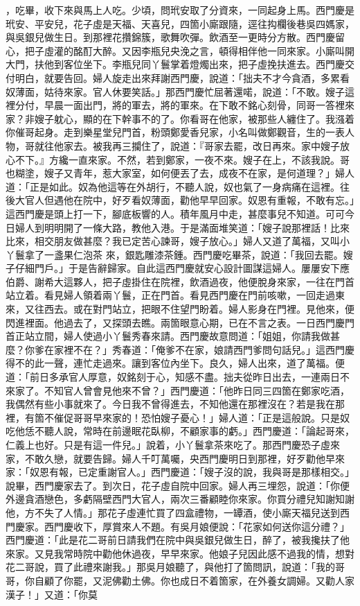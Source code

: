，吃畢，收下來與馬上人吃。少頃，問玳安取了分資來，一同起身上馬。西門慶是玳安、平安兒，花子虛是天福、天喜兒，四箇小廝跟隨，逕往抅欄後巷吳四媽家，與吳銀兒做生日。到那裡花攢錦簇，歌舞吹彈。飲酒至一更時分方散。西門慶留心，把子虛灌的酩酊大醉。又因李瓶兒央浼之言，頓得相伴他一同來家。小廝叫開大門，扶他到客位坐下。李瓶兒同丫鬟掌着燈燭出來，把子虛挽扶進去。西門慶交付明白，就要告回。婦人旋走出來拜謝西門慶，說道：「拙夫不才今貪酒，多累看奴薄面，姑待來家。官人休要笑話。」那西門慶忙屈著還喏，說道：「不敢。嫂子這裡分付，早晨一面出門，將的軍去，將的軍來。在下敢不銘心刻骨，同哥一答裡來家？非嫂子躭心，顯的在下幹事不的了。你看哥在他家，被那些人纏住了。我漒着你催哥起身。走到樂星堂兒門首，粉頭鄭愛香兒家，小名叫做鄭觀音，生的一表人物，哥就往他家去。被我再三攔住了，說道：『哥家去罷，改日再來。家中嫂子放心不下。』方纔一直來家。不然，若到鄭家，一夜不來。嫂子在上，不該我說。哥也糊塗，嫂子又青年，惹大家室，如何便丟了去，成夜不在家，是何道理？」婦人道：「正是如此。奴為他這等在外胡行，不聽人說，奴也氣了一身病痛在這裡。往後大官人但遇他在院中，好歹看奴薄面，勸他早早回家。奴恩有重報，不敢有忘。」這西門慶是頭上打一下，腳底板響的人。積年風月中走，甚麼事兒不知道。可可今日婦人到明明開了一條大路，教他入港。于是滿面堆笑道：「嫂子說那裡話！比來比來，相交朋友做甚麼？我已定苦心諫哥，嫂子放心。」婦人又道了萬福，又叫小丫鬟拿了一盞果仁泡茶 來，銀匙雕漆茶鍾。西門慶吃畢茶，說道：「我回去罷。嫂子仔細門戶。」于是告辭歸家。自此這西門慶就安心設計圖謀這婦人。屢屢安下應伯爵、謝希大這夥人，把子虛掛住在院裡，飲酒過夜，他便脫身來家，一往在門首站立着。看見婦人領着兩丫鬟，正在門首。看見西門慶在門前咳嗽，一回走過東來，又往西去。或在對門站立，把眼不住望門盼着。婦人影身在門裡。見他來，便閃進裡面。他過去了，又探頭去瞧。兩箇眼意心期，已在不言之表。一日西門慶門首正站立間，婦人使過小丫鬟秀春來請。西門慶故意問道：「姐姐，你請我做甚麼？你爹在家裡不在？」秀春道：「俺爹不在家，娘請西門爹問句話兒。」這西門慶得不的此一聲，連忙走過來。讓到客位內坐下。良久，婦人出來，道了萬福。便道：「前日多承官人厚意，奴銘刻于心，知感不盡。拙夫從昨日出去，一連兩日不來家了。不知官人曾會見他來不曾？」西門慶道：「他昨日同三四箇在鄭家吃酒，我偶然有些小事就來了。今日我不曾得進去，不知他還在那裡沒在？若是我在那裡，有箇不催促哥哥早來家的！恐怕嫂子憂心！」婦人道：「正是這般說。只是奴吃他恁不聽人說，常時在前邊眠花臥柳，不顧家事的虧。」西門慶道：「論起哥來，仁義上也好。只是有這一件兒。」說着，小丫鬟拿茶來吃了。那西門慶恐子虛來家，不敢久戀，就要告歸。婦人千叮萬囑，央西門慶明日到那裡，好歹勸他早來家：「奴恩有報，已定重謝官人。」西門慶道：「嫂子沒的說，我與哥是那樣相交。」說畢，西門慶家去了。到次日，花子虛自院中回家。婦人再三埋怨，說道：「你便外邊貪酒戀色，多虧隔壁西門大官人，兩次三番顧睦你來家。你買分禮兒知謝知謝他，方不失了人情。」那花子虛連忙買了四盒禮物，一罈酒，使小廝天福兒送到西門慶家。西門慶收下，厚賞來人不題。有吳月娘便說：「花家如何送你這分禮？」西門慶道：「此是花二哥前日請我們在院中與吳銀兒做生日，醉了，被我攙扶了他來家。又見我常時院中勸他休過夜，早早來家。他娘子兒因此感不過我的情，想對花二哥說，買了此禮來謝我。」那吳月娘聽了，與他打了箇問訊，說道：「我的哥哥，你自顧了你罷，又泥佛勸土佛。你也成日不着箇家，在外養女調婦。又勸人家漢子！」又道：「你莫